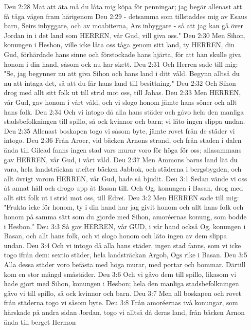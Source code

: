 Deu 2:28  Mat att äta må du låta mig köpa för penningar; jag begär allenast att få tåga vägen fram härigenom
Deu 2:29  - detsamma som tillstaddes mig av Esaus barn, Seirs inbyggare, och av moabiterna, Ars inbyggare - så att jag kan gå över Jordan in i det land som HERREN, vår Gud, vill giva oss."
Deu 2:30  Men Sihon, konungen i Hesbon, ville icke låta oss tåga genom sitt land, ty HERREN, din Gud, förhärdade hans sinne och förstockade hans hjärta, för att han skulle giva honom i din hand, såsom ock nu har skett.
Deu 2:31  Och Herren sade till mig: "Se, jag begynner nu att giva Sihon och hans land i ditt våld. Begynn alltså du nu att intaga det, så att du får hans land till besittning."
Deu 2:32  Och Sihon drog med allt sitt folk ut till strid mot oss, till Jahas.
Deu 2:33  Men HERREN, vår Gud, gav honom i vårt våld, och vi slogo honom jämte hans söner och allt hans folk.
Deu 2:34  Och vi intogo då alla hans städer och gåvo hela den manliga stadsbefolkningen till spillo, så ock kvinnor och barn; vi läto ingen slippa undan.
Deu 2:35  Allenast boskapen togo vi såsom byte, jämte rovet från de städer vi intogo.
Deu 2:36  Från Aroer, vid bäcken Arnons strand, och från staden i dalen ända till Gilead fanns ingen stad vars murar voro för höga för oss; allasammans gav HERREN, vår Gud, i vårt våld.
Deu 2:37  Men Ammons barns land lät du vara, hela landsträckan utefter bäcken Jabbok, och städerna i bergsbygden, och allt övrigt varom HERREN, vår Gud, hade så bjudit.
Deu 3:1  Sedan vände vi oss åt annat håll och drogo upp åt Basan till. Och Og, konungen i Basan, drog med allt sitt folk ut i strid mot oss, till Edrei.
Deu 3:2  Men HERREN sade till mig: "Frukta icke för honom, ty i din hand har jag givit honom och allt hans folk och honom på samma sätt som du gjorde med Sihon, amoréernas konung, som bodde i Hesbon."
Deu 3:3  Så gav HERREN, vår GUD, i vår hand också Og, konungen i Basan, och allt hans folk, och vi slogo honom och läto ingen av dem slippa undan.
Deu 3:4  Och vi intogo då alla hans städer, ingen stad fanns, som vi icke togo ifrån dem: sextio städer, hela landsträckan Argob, Ogs rike i Basan.
Deu 3:5  Alla dessa städer voro befästa med höga murar, med portar och bommar. Därtill kom en stor mängd småstäder.
Deu 3:6  Och vi gåvo dem till spillo, likasom vi hade gjort med Sihon, konungen i Hesbon; hela den manliga stadsbefolkningen gåvo vi till spillo, så ock kvinnor och barn.
Deu 3:7  Men all boskapen och rovet från städerna togo vi såsom byte.
Deu 3:8  Från amoréernas två konungar, som härskade på andra sidan Jordan, togo vi alltså då deras land, från bäcken Arnon ända till berget Hermon
